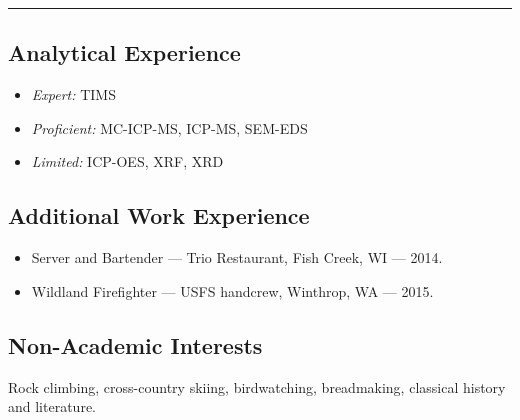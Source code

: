 \documentclass[10pt]{article}
\begin{document}
\begin{center}{\rule{2.5in}{0.5pt}}\end{center}

\subsection*{\textbf{Analytical Experience}}
\begin{itemize} [label={}]
	\item \textit{Expert:} TIMS
	\item \textit{Proficient:} MC-ICP-MS, ICP-MS, SEM-EDS
	\item \textit{Limited:} ICP-OES, XRF, XRD
\end{itemize}


\subsection*{\textbf{Additional Work Experience}}
\begin{itemize}[label={}]
	\item Server and Bartender --- Trio Restaurant, Fish Creek, WI --- 2014.
	\item Wildland Firefighter --- USFS handcrew, Winthrop, WA --- 2015.
\end{itemize}


\subsection*{\textbf{Non-Academic Interests}} \hspace{5ex}
 Rock climbing, cross-country skiing, birdwatching, breadmaking, classical history and literature.

\end{document}
